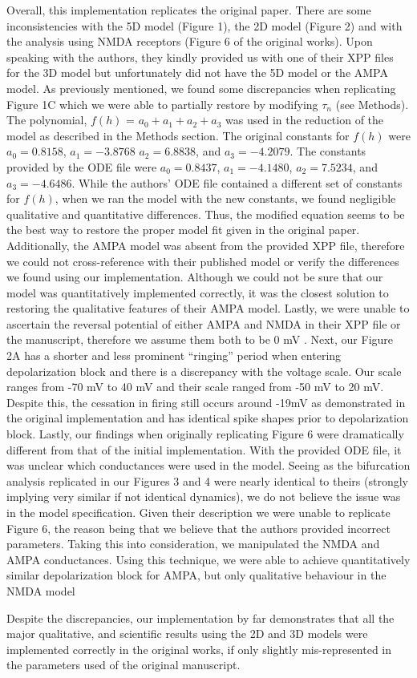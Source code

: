 Overall, this implementation replicates the original paper. There are some inconsistencies with the 5D model (Figure 1), the 2D model (Figure 2) and with the analysis using NMDA receptors (Figure 6 of the original works). Upon speaking with the authors, they kindly provided us with one of their XPP files for the 3D model but unfortunately did not have the 5D model or the AMPA model. As previously mentioned, we found some discrepancies when replicating Figure 1C which we were able to partially restore by modifying $\tau_n$ (see Methods). The polynomial, $f(h)$ = $a_0 + a_1 + a_2 + a_3$ was used in the reduction of the model as described in the Methods section.  The original constants for $f(h)$ were $a_0 =0.8158$, $a_1= −3.8768$ $a_2 = 6.8838$, and $a_3 = −4.2079$. The constants provided by the ODE file were $a_0 = 0.8437$, $a_1 = -4.1480$, $a_2 = 7.5234$, and $a_3 = -4.6486$. While the authors’ ODE file contained a different set of constants for $f(h)$, when we ran the model with the new constants, we found negligible qualitative and quantitative differences. Thus, the modified equation seems to be the best way to restore the proper model fit given in the original paper. Additionally, the AMPA model was absent from the provided XPP file, therefore we could not cross-reference with their published model or verify the differences we found using our implementation. Although we could not be sure that our model was quantitatively implemented correctly, it was the closest solution to restoring the qualitative features of their AMPA model. Lastly, we were unable to ascertain the reversal potential of either AMPA and NMDA in their XPP file or the manuscript, therefore we assume them both to be 0 mV \cite{neuroscience_2001}. Next, our Figure 2A has a shorter and less prominent ``ringing'' period when entering depolarization block and there is a discrepancy with the voltage scale. Our scale ranges from -70 mV to 40 mV and their scale ranged from -50 mV to 20 mV.  Despite this, the cessation in firing still occurs around -19mV as demonstrated in the original implementation and has identical spike shapes prior to depolarization block. Lastly, our findings when originally replicating Figure 6 were dramatically different from that of the initial implementation. With the provided ODE file, it was unclear which conductances were used in the model. Seeing as the bifurcation analysis replicated in our Figures 3 and 4 were nearly identical to theirs (strongly implying very similar if not identical dynamics), we do not believe the issue was in the model specification. Given their description we were unable to replicate Figure 6, the reason being that we believe that the authors provided incorrect parameters. Taking this into consideration, we manipulated the NMDA and AMPA conductances. Using this technique, we were able to achieve quantitatively similar depolarization block for AMPA, but only qualitative behaviour in the NMDA model

Despite the discrepancies, our implementation by far demonstrates that all the major qualitative, and scientific results using the 2D and 3D models were implemented correctly in the original works, if only slightly mis-represented in the parameters used of the original manuscript.
